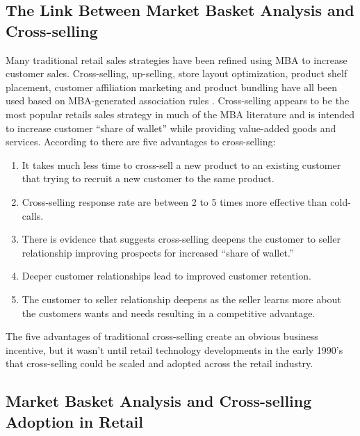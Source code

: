 \documentclass[../article.tex, 12pt]{subfiles}
\begin{document}
\begin{multicols*}{2}
\subsection{The Link Between Market Basket Analysis and Cross-selling}

Many traditional retail sales strategies have been refined using MBA to increase customer sales. Cross-selling, up-selling, store layout optimization, product shelf placement, customer affiliation marketing and product bundling have all been used based on MBA-generated association rules \citep{kamakura2008cross, derdenger2013dynamic, ting2010finding, bermudez2016layout, berg2018emerging}. Cross-selling appears to be the most popular retails sales strategy in much of the MBA literature and is intended to increase customer ``share of wallet'' while providing value-added goods and services. According to \cite{kamakura2008cross} there are five advantages to cross-selling:
\begin{enumerate}
\item It takes much less time to cross-sell a new product to an existing customer that trying to recruit a new customer to the same product.
\item Cross-selling response rate are between 2 to 5 times more effective than cold-calls.
\item There is evidence that suggests cross-selling deepens the customer to seller relationship improving prospects for increased ``share of wallet.''
\item Deeper customer relationships lead to improved customer retention.
\item The customer to seller relationship deepens as the seller learns more about the customers wants and needs resulting in a competitive advantage.
\end{enumerate}

The five advantages of traditional cross-selling create an obvious business incentive, but it wasn't until retail technology developments in the early 1990's that cross-selling could be scaled and adopted across the retail industry.

\subsection{Market Basket Analysis and Cross-selling Adoption in Retail}


\end{multicols*}
\end{document}
